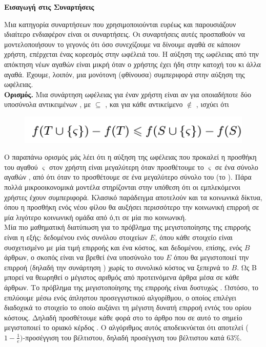 {{{{{{{{%
\textbf{Εισαγωγή στις {} Συναρτήσεις}

Μια κατηγορία συναρτήσεων που χρησιμοποιούνται ευρέως 
και παρουσιάζουν ιδιαίτερο ενδιαφέρον είναι οι {} συναρτήσεις. 
Οι συναρτήσεις αυτές προσπαθούν να μοντελοποιήσουν το γεγονός ότι 
όσο συνεχίζουμε να δίνουμε αγαθά σε κάποιον χρήστη, 
επέρχεται ένας κορεσμός στην ωφέλειά του. 
Η αύξηση της ωφέλειας από την απόκτηση νέων αγαθών είναι μικρή όταν ο χρήστης έχει ήδη στην κατοχή του κι άλλα αγαθά. 
Έχουμε, λοιπόν, μια μονότονη (φθίνουσα) συμπεριφορά στην αύξηση της ωφέλειας. \\

\textbf{Ορισμός.} Μια συνάρτηση ωφέλειας {} για έναν χρήστη {} είναι {} 
αν για οποιαδήποτε δύο υποσύνολα αντικειμένων \textit{{}}, με \textit{{}} $\subseteq$ \textit{{}}, 
και για κάθε αντικείμενο \textit{{}} $\notin$ \textit{{}}, ισχύει ότι 

\begin{figure}[!ht] \centering
    \includegraphics[scale=0.55]{static/figures/modul.png}
    \label{}
\end{figure} 

Ο παραπάνω ορισμός μάς λέει ότι η αύξηση της ωφέλειας που προκαλεί η προσθήκη του αγαθού $\varsigma$ στον χρήστη {} 
είναι μεγαλύτερη όταν προσθέτουμε το $\varsigma$ σε ένα σύνολο αγαθών {}, από ότι όταν το προσθέτουμε σε ένα 
μεγαλύτερο σύνολο του {} (το {)}. Πάρα πολλά μικροοικονομικά μοντέλα στηρίζονται στην υπόθεση ότι οι 
εμπλεκόμενοι χρήστες έχουν {} συμπεριφορά. Κλασικό παράδειγμα αποτελούν και τα κοινωνικά δίκτυα, 
όπου η προσθήκη ενός νέου φίλου θα αυξήσει περισσότερο την κοινωνική επιρροή σε μία λιγότερο κοινωνική ομάδα 
από ό,τι σε μία πιο κοινωνική. \\

Μία πιο μαθηματική διατύπωση για το πρόβλημα της μεγιστοποίησης της επιρροής είναι η εξής: 
δεδομένου ενός συνόλου στοιχείων $E$, όπου κάθε στοιχείο είναι συσχετισμένο με μία τιμή επιρροής και ένα κόστος, 
και δεδομένου, επίσης, ενός {} $B$ άρθρων, ο σκοπός είναι να βρεθεί ένα υποσύνολο του $E$ όπου θα 
μεγιστοποιεί την επιρροή (δηλαδή την συνάρτηση {}) χωρίς το συνολικό κόστος να ξεπερνά το {} $B$. 
Ως {} B μπορεί να θεωρηθεί ο μέγιστος αριθμός από προτεινόμενα άρθρα μέσα σε κάθε {} άρθρων. 
Το πρόβλημα της μεγιστοποίησης της επιρροής είναι δυστυχώς {}. 
Ωστόσο, το επιλύουμε μέσω ενός άπληστου {} προσεγγιστικού αλγορίθμου, 
ο οποίος επιλέγει διαδοχικά το στοιχείο το οποίο αυξάνει τη μέγιστη δυνατή επιρροή εντός του ορίου κόστους. 
Δηλαδή προσθέτουμε κάθε φορά στο {} το άρθρο που σε αυτό το σημείο μεγιστοποιεί το οριακό κέρδος {}.
Ο αλγόριθμος αυτός αποδεικνύεται ότι αποτελεί ($1 - \frac{1}{e})$-προσέγγιση του βέλτιστου, δηλαδή προσέγγιση του βέλτιστου κατά 63\%. \\

}}}}}}}}

